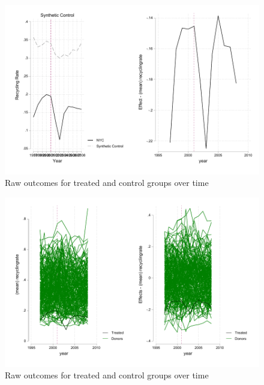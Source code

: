 \documentclass{article}
\begin{document}
\begin{enumerate}
\begin{enumerate}
        
            \begin{figure}[ht]
            \centering
            \includegraphics[scale = 0.7]{5b_combine_effecttc.pdf}
            \caption{Raw outcomes for treated and control groups over time}
            \label{fig:5b_combine_effecttc}
            \end{figure}
            
           
            \begin{figure}[ht]
            \centering
            \includegraphics[scale = 0.7]{hw8_q5raw.pdf}
            \caption{Raw outcomes for treated and control groups over time}
            \label{fig:hw8_q5raw}
            \end{figure}

        
       

        






\end{enumerate}
\end{enumerate}
\end{document}
